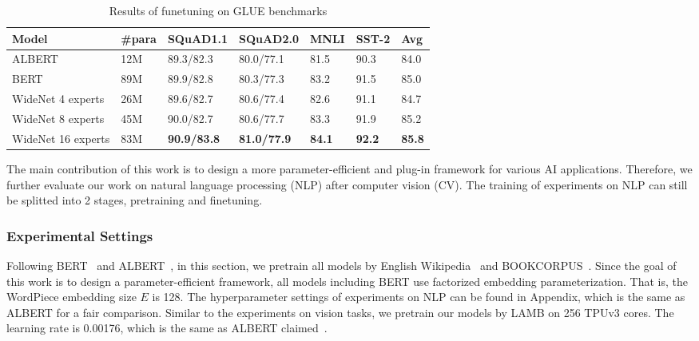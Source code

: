 \documentclass[letterpaper]{article} \usepackage{aaai22}  \usepackage{times}  \usepackage{helvet}  \usepackage{courier}  \usepackage[hyphens]{url}  \usepackage{graphicx} \urlstyle{rm} \def\UrlFont{\rm}  \usepackage{natbib}  \usepackage{caption} \DeclareCaptionStyle{ruled}{labelfont=normalfont,labelsep=colon,strut=off} \frenchspacing  \setlength{\pdfpagewidth}{8.5in}  \setlength{\pdfpageheight}{11in}  \usepackage{algorithm}
\begin{document}
\begin{table*}[t]
\centering
\caption{Results of funetuning on GLUE benchmarks}
\label{tbl-nlp-finetune}
\begin{tabular}{l|lllll|l}
\toprule
Model                   & \#para & SQuAD1.1 & SQuAD2.0 & MNLI & SST-2  & Avg\\ \midrule
ALBERT                & 12M    & 89.3/82.3 & 80.0/77.1 & 81.5 & 90.3 & 84.0 \\
BERT                  & 89M    & 89.9/82.8 & 80.3/77.3 & 83.2 & 91.5  & 85.0\\  \midrule
WideNet 4 experts  & 26M    & 89.6/82.7 & 80.6/77.4 &  82.6 & 91.1  & 84.7 \\ 
WideNet 8 experts  & 45M    & 90.0/82.7 & 80.6/77.7 & 83.3 & 91.9 &  85.2 \\ 

WideNet 16 experts & 83M    & \textbf{90.9/83.8} & \textbf{81.0/77.9} & \textbf{84.1} & \textbf{92.2}  & \textbf{85.8}\\
\bottomrule
\end{tabular}
\end{table*}









The main contribution of this work is to design a more parameter-efficient and plug-in framework for various AI applications. Therefore, we further evaluate our work on natural language processing (NLP) after computer vision (CV). The training of experiments on NLP can still be splitted into 2 stages, pretraining and finetuning. 

\subsubsection{Experimental Settings}
\label{sec:nlp-settings}


Following BERT~\citep{devlin-etal-2019-bert} and ALBERT~\citep{lan2019albert}, in this section, we pretrain all models by English Wikipedia~\citep{devlin-etal-2019-bert} and BOOKCORPUS~\citep{zhu2015aligning}. Since the goal of this work is to design a parameter-efficient framework, all models including BERT use factorized embedding parameterization. That is, the WordPiece embedding size $E$ is 128. The hyperparameter settings of experiments on NLP can be found in Appendix, which is the same as ALBERT for a fair comparison. Similar to the experiments on vision tasks, we pretrain our models by LAMB on 256 TPUv3 cores. The learning rate is 0.00176, which is the same as ALBERT claimed~\citep{you2019reducing}.
\end{document}
